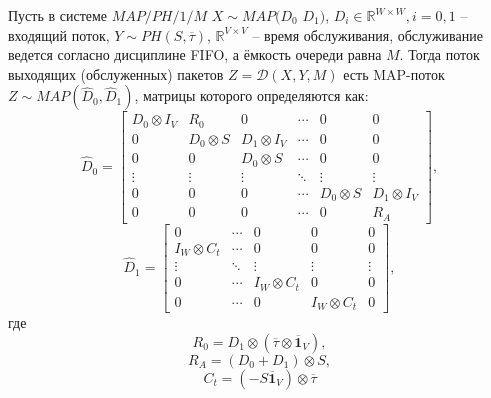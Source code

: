 \begin{thm}\label{th:ch4_departure_map}
  Пусть в системе $MAP/PH/1/M$ $X \sim MAP(D_{0}$ $D_{1})$, $D_i \in \mathbb{R}^{W \times W}, i=0,1$ -- входящий поток, $Y \sim PH(S, \overline{\tau})$, $\mathbb{R}^{V \times V}$ -- время обслуживания, обслуживание ведется согласно дисциплине FIFO, а ёмкость очереди равна $M$. Тогда поток выходящих (обслуженных) пакетов $Z = \mathcal{D}(X, Y, M)$ есть MAP-поток $Z \sim MAP(\hat{D}_{0},\hat{D}_{1})$, матрицы которого определяются как:
  \begin{equation}
	  \label{eq:ch4_map_ph1n_d0}
	  \hat{D}_{0} = 
	  \begin{bmatrix}
  		D_{0} \otimes I_{V} & R_{0} & 0 & \cdots & 0 & 0\\	
	  	0 & D_{0} \otimes S & D_{1} \otimes I_{V} & \cdots & 0 & 0\\
		  0 & 0 & D_{0} \otimes S & \cdots & 0 & 0 \\
		  \vdots & \vdots & \vdots & \ddots & \vdots & \vdots \\
  		0 & 0 & 0 & \cdots & D_{0} \otimes S & D_{1} \otimes I_{V}\\
	  	0 & 0 & 0 & \cdots & 0 & R_{A}
	  \end{bmatrix},
  \end{equation}
  \begin{equation}
	  \label{eq:ch4_map_ph1n_d1}
	  \hat{D}_{1} = 
	    \begin{bmatrix}
		    0 & \cdots & 0 & 0 & 0 \\	
		    I_{W} \otimes C_{t} & \cdots & 0 & 0 & 0 \\
		    \vdots & \ddots & \vdots & \vdots & \vdots \\
		    0 & \cdots & I_{W} \otimes C_{t} & 0 & 0\\
		    0 & \cdots & 0 & I_{W} \otimes C_{t} & 0
	    \end{bmatrix},
  \end{equation}
  где 
  \begin{equation*}
	  R_{0} = D_{1}\otimes (\overline{\tau} \otimes \overline{\mathbf{1}}_{V}),
  \end{equation*}	
  \begin{equation*}
	  R_{A} = (D_{0}+D_{1}) \otimes S,
  \end{equation*}
  \begin{equation*}
	  C_{t} = (-S \overline{\mathbf{1}}_{V}) \otimes \overline{\tau}
  \end{equation*}
\end{thm}

